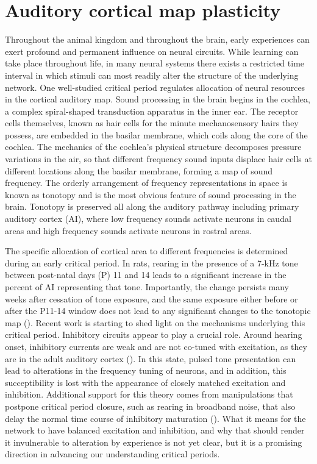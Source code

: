 
\section{Auditory cortical map plasticity}

Throughout the animal kingdom and throughout the brain, early experiences can exert profound and permanent influence on neural circuits. While learning can take place throughout life, in many neural systems there exists a restricted time interval in which stimuli can most readily alter the structure of the underlying network. One well-studied critical period regulates allocation of neural resources in the cortical auditory map. Sound processing in the brain begins in the cochlea, a complex spiral-shaped transduction apparatus in the inner ear. The receptor cells themselves, known as hair cells for the minute mechanosensory hairs they possess, are embedded in the basilar membrane, which coils along the core of the cochlea. The mechanics of the cochlea's physical structure decomposes pressure variations in the air, so that different frequency sound inputs displace hair cells at different locations along the basilar membrane, forming a map of sound frequency. The orderly arrangement of frequency representations in space is known as tonotopy and is the most obvious feature of sound processing in the brain. Tonotopy is preserved all along the auditory pathway including primary auditory cortex (AI), where low frequency sounds activate neurons in caudal areas and high frequency sounds activate neurons in rostral areas.

The specific allocation of cortical area to different frequencies is determined during an early critical period. In rats, rearing in the presence of a 7-kHz tone between post-natal days (P) 11 and 14 leads to a significant increase in the percent of AI representing that tone. Importantly, the change persists many weeks after cessation of tone exposure, and the same exposure either before or after the P11-14 window does not lead to any significant changes to the tonotopic map (\cite{DeVillers-Sidani2007}). Recent work is starting to shed light on the mechanisms underlying this critical period. Inhibitory circuits appear to play a crucial role. Around hearing onset, inhibitory currents are weak and are not co-tuned with excitation, as they are in the adult auditory cortex (\cite{Dorrn2010}). In this state, pulsed tone presentation can lead to alterations in the frequency tuning of neurons, and in addition, this succeptibility is lost with the appearance of closely matched excitation and inhibition. Additional support for this theory comes from manipulations that postpone critical period closure, such as rearing in broadband noise, that also delay the normal time course of inhibitory maturation (\cite{DeVillers-Sidani2008}). What it means for the network to have balanced excitation and inhibition, and why that should render it invulnerable to alteration by experience is not yet clear, but it is a promising direction in advancing our understanding critical periods.

